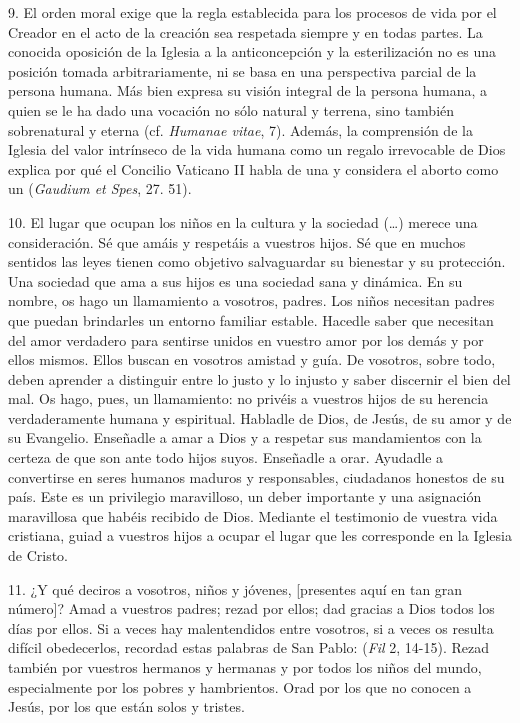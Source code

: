 \begin{body}
\begin{body}
		9. El orden moral exige que la regla establecida para los procesos de vida por el Creador en el acto de la creación sea respetada siempre y en todas partes. La conocida oposición de la Iglesia a la anticoncepción y la esterilización no es una posición tomada arbitrariamente, ni se basa en una perspectiva parcial de la persona humana. Más bien expresa su visión integral de la persona humana, a quien se le ha dado una vocación no sólo natural y terrena, sino también sobrenatural y eterna (cf. \emph{Humanae vitae}, 7). Además, la comprensión de la Iglesia del valor intrínseco de la vida humana como un regalo irrevocable de Dios explica por qué el Concilio Vaticano II habla de una  y considera el aborto como un  (\emph{Gaudium et Spes}, 27. 51).

		10. El lugar que ocupan los niños en la cultura y la sociedad (\ldots{}) merece una consideración. Sé que amáis y respetáis a vuestros hijos. Sé que en muchos sentidos las leyes tienen como objetivo salvaguardar su bienestar y su protección. Una sociedad que ama a sus hijos es una sociedad sana y dinámica. En su nombre, os hago un llamamiento a vosotros, padres. Los niños necesitan padres que puedan brindarles un entorno familiar estable. Hacedle saber que necesitan del amor verdadero para sentirse unidos en vuestro amor por los demás y por ellos mismos. Ellos buscan en vosotros amistad y guía. De vosotros, sobre todo, deben aprender a distinguir entre lo justo y lo injusto y saber discernir el bien del mal. Os hago, pues, un llamamiento: no privéis a vuestros hijos de su herencia verdaderamente humana y espiritual. Habladle de Dios, de Jesús, de su amor y de su Evangelio. Enseñadle a amar a Dios y a respetar sus mandamientos con la certeza de que son ante todo hijos suyos. Enseñadle a orar. Ayudadle a convertirse en seres humanos maduros y responsables, ciudadanos honestos de su país. Este es un privilegio maravilloso, un deber importante y una asignación maravillosa que habéis recibido de Dios. Mediante el testimonio de vuestra vida cristiana, guiad a vuestros hijos a ocupar el lugar que les corresponde en la Iglesia de Cristo.

		11. ¿Y qué deciros a vosotros, niños y jóvenes, {[}presentes aquí en tan gran número{]}? Amad a vuestros padres; rezad por ellos; dad gracias a Dios todos los días por ellos. Si a veces hay malentendidos entre vosotros, si a veces os resulta difícil obedecerlos, recordad estas palabras de San Pablo:  (\emph{Fil} 2, 14-15). Rezad también por vuestros hermanos y hermanas y por todos los niños del mundo, especialmente por los pobres y hambrientos. Orad por los que no conocen a Jesús, por los que están solos y tristes.


\end{body}
\end{body}
